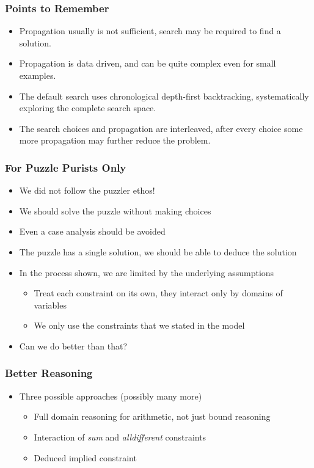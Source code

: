 \begin{frame}
\frametitle{Points to Remember}
\begin{itemize}
\item Propagation usually is not sufficient, search may be required to find a solution.
\item Propagation is data driven, and can be quite complex even for small examples.
\item The default search uses chronological depth-first backtracking, systematically exploring the complete search space.
\item The search choices and propagation are interleaved, after every choice some more propagation may further reduce the problem.
\end{itemize}
\end{frame}

\begin{frame}
\frametitle{For Puzzle Purists Only}
\begin{itemize}
\item We did not follow the puzzler ethos!
\item We should solve the puzzle without making choices
\item Even a case analysis should be avoided
\item The puzzle has a single solution, we should be able to deduce the solution
\item In the process shown, we are limited by the underlying assumptions
\begin{itemize}
\item Treat each constraint on its own, they interact only by domains of variables
\item We only use the constraints that we stated in the model
\end{itemize}
\item Can we do better than that?
\end{itemize}
\hyperlink{sendmore:not an expert}{}
\end{frame}

\begin{frame}
\frametitle{Better Reasoning}
\begin{itemize}
\item Three possible approaches (possibly many more)
\begin{itemize}
\item Full domain reasoning for arithmetic, not just bound reasoning
\item Interaction of {\em sum} and {\em alldifferent} constraints
\item Deduced implied constraint
\end{itemize}
\end{itemize}
\end{frame}

